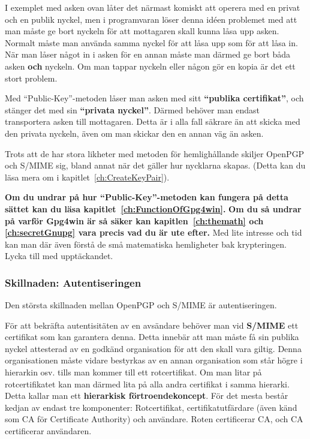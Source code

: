 \documentclass[a4paper,11pt, oneside,openright,titlepage,dvips]{scrbook}
\newcounter{chapter}
\newcounter{section}[chapter]
\begin{document}
I exemplet med asken ovan låter det närmast komiskt att operera med en privat
och en publik nyckel, men i programvaran löser denna idéen problemet med att
man måste ge bort nyckeln för att mottagaren skall kunna låsa upp asken.
Normalt måste man använda samma nyckel för att låsa upp som för att låsa in.
När man låser något in i asken för en annan måste man därmed ge bort båda asken
\textbf{och} nyckeln. Om man tappar nyckeln eller någon gör en kopia är det 
ett stort problem.

Med "`Public-Key"'-metoden låser man asken med sitt 
\textbf{"`publika certifikat"'}, och stänger det med sin 
\textbf{"`privata nyckel"'}. Därmed behöver man endast transportera asken
till mottagaren. Detta är i alla fall säkrare än att skicka med den privata
nyckeln, även om man skickar den en annan väg än asken.

Trots att de har stora likheter med metoden för hemlighållande skiljer
OpenPGP och S/MIME sig, bland annat när det gäller hur nycklarna skapas.
(Detta kan du läsa mera om i kapitlet~\ref{ch:CreateKeyPair}).

\textbf{Om du undrar på hur "`Public-Key"'-metoden kan fungera på detta
sättet kan du läsa kapitlet~\ref{ch:FunctionOfGpg4win}.}
\textbf{Om du så undrar på varför Gpg4win är så säker kan 
kapitlen~\ref{ch:themath} och \ref{ch:secretGnupg} 
vara precis vad du är ute efter.}
Med lite intresse och tid kan man där även förstå de små matematiska
hemligheter bak krypteringen. Lycka till med upptäckandet.


\clearpage
\subsubsection{Skillnaden: Autentiseringen}

Den största skillnaden mellan OpenPGP och S/MIME är autentiseringen.

För att bekräfta autentisitäten av en avsändare behöver man vid 
\textbf{S/MIME} ett certifikat som kan garantera denna. Detta innebär
att man måste få sin publika nyckel attesterad av en godkänd organisation
för att den skall vara giltig. Denna organisationen måste vidare bestyrkas
av en annan organisation som står högre i hierarkin osv. tills man kommer
till ett rotcertifikat. Om man litar på rotcertifikatet kan man därmed
lita på alla andra certifikat i samma hierarki. Detta kallar man ett
\textbf{hierarkisk förtroendekoncept}. För det mesta består kedjan av
endast tre komponenter: Rotcertifikat, certifikatutfärdare (även känd
som CA för Certificate Authority) och användare. Roten certificerar
CA, och CA certificerar användaren.
\end{document}
